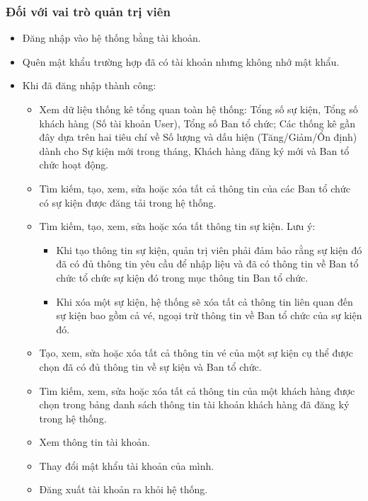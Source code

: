 \subsubsection{Đối với vai trò quản trị viên}
\begin{itemize}
    \item[-] Đăng nhập vào hệ thống bằng tài khoản.
    \item[-] Quên mật khẩu trường hợp đã có tài khoản nhưng không nhớ mật khẩu.
    \item[-] Khi đã đăng nhập thành công:
    \begin{itemize}
        \item[+] Xem dữ liệu thống kê tổng quan toàn hệ thống: Tổng số sự kiện, Tổng số khách hàng (Số tài khoản User), Tổng số Ban tổ chức; Các thống kê gần đây dựa trên hai tiêu chí về Số lượng và dấu hiện (Tăng/Giảm/Ổn định) dành cho Sự kiện mới trong tháng, Khách hàng đăng ký mới và Ban tổ chức hoạt động.
        \item[+] Tìm kiếm, tạo, xem, sửa hoặc xóa tất cả thông tin của các Ban tổ chức có sự kiện được đăng tải trong hệ thống.
        \item[+] Tìm kiếm, tạo, xem, sửa hoặc xóa tất thông tin sự kiện. Lưu ý:
        \begin{itemize}
            \item[1.] Khi tạo thông tin sự kiện, quản trị viên phải đảm bảo rằng sự kiện đó đã có đủ thông tin yêu cầu để nhập liệu và đã có thông tin về Ban tổ chức tổ chức sự kiện đó trong mục thông tin Ban tổ chức.
            \item[2.] Khi xóa một sự kiện, hệ thống sẽ xóa tất cả thông tin liên quan đến sự kiện bao gồm cả vé, ngoại trừ thông tin về Ban tổ chức của sự kiện đó.
        \end{itemize}
        \item[+] Tạo, xem, sửa hoặc xóa tất cả thông tin vé của một sự kiện cụ thể được chọn đã có đủ thông tin về sự kiện và Ban tổ chức.
        \item[+] Tìm kiếm, xem, sửa hoặc xóa tất cả thông tin của một khách hàng được chọn trong bảng danh sách thông tin tài khoản khách hàng đã đăng ký trong hệ thống.
        \item[+] Xem thông tin tài khoản.
        \item[+] Thay đổi mật khẩu tài khoản của mình.
        \item[+] Đăng xuất tài khoản ra khỏi hệ thống.
    \end{itemize}
\end{itemize}
